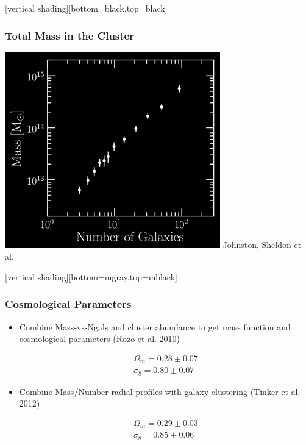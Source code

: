 \documentclass{beamer}
\begin{document}
{
    [vertical shading][bottom=black,top=black]


    \frame
    {
        \frametitle{Total Mass in the Cluster}

        \begin{center}
            \includegraphics[width=0.7\textwidth]{mass-rich-plot-icolors.png}
            \newline
            \hfill {\color{gold} Johnston, Sheldon et al.}
        \end{center}
    }
    [vertical shading][bottom=mgray,top=mblack]
}

\frame
{
    \frametitle{Cosmological Parameters}
    \begin{itemize}

        \item Combine Mass-vs-Ngals and cluster abundance to get mass function and
            cosmological parameters {\color{cyan}{\tiny (assuming $H_0=70$km/s)}}
            (Rozo et al. 2010)

            {\color{gold}
                \begin{eqnarray}
                    \Omega_m = 0.28 \pm 0.07 \nonumber \\
                    \sigma_8 = 0.80 \pm 0.07 \nonumber
                \end{eqnarray}
            }

        \item Combine Mass/Number radial profiles with galaxy clustering 
            {\color{cyan}{\tiny (assuming $H_0=72$km/s)}}
            (Tinker et al. 2012)

            {\color{gold}
                \begin{eqnarray}
                    \Omega_m = 0.29 \pm 0.03 \nonumber \\
                    \sigma_8 = 0.85 \pm 0.06 \nonumber
                \end{eqnarray}
            }


    \end{itemize}
}
\end{document}
